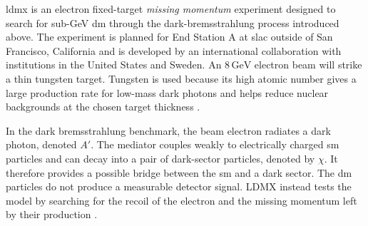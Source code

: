 


\Gls{ldmx} is an electron fixed-target \textit{missing momentum} experiment
designed to search for sub-GeV \gls{dm} through the dark-bremsstrahlung
process introduced above. The experiment is planned for End Station A at
\gls{slac} outside of San Francisco, California and is developed by an international collaboration
with institutions in the United States and Sweden. An \(8\,\mathrm{GeV}\)
electron beam will strike a thin tungsten target. Tungsten is used because
its high atomic number gives a large production rate for low-mass dark
photons and helps reduce nuclear backgrounds at the chosen target thickness
\cite{ldmx2025-overview}.






In the dark bremsstrahlung benchmark, the beam electron radiates a
\gls{dark photon}, denoted \(A'\). The mediator couples weakly to electrically
charged \gls{sm} particles and can decay into a pair of dark-sector particles,
denoted by \(\chi\). It therefore provides a possible bridge between the
\gls{sm} and a dark sector. The \gls{dm} particles do not produce a
measurable detector signal. LDMX instead tests the model by searching for the
recoil of the electron and the missing momentum left by their production
\cite{akesson2018-ldmx,ldmx2025-overview}.

